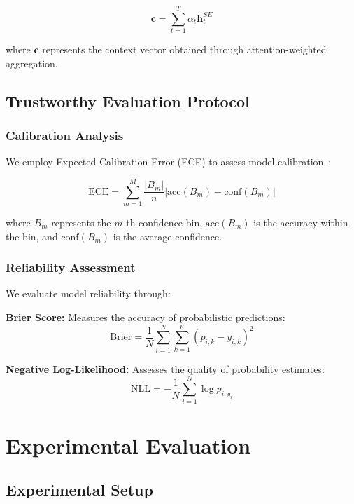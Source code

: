 \documentclass[journal]{IEEEtran}
\begin{document}
\begin{equation}
\mathbf{c} = \sum_{t=1}^{T} \alpha_t \mathbf{h}_t^{SE}
\end{equation}

where $\mathbf{c}$ represents the context vector obtained through attention-weighted aggregation.

\subsection{Trustworthy Evaluation Protocol}

\subsubsection{Calibration Analysis}

We employ Expected Calibration Error (ECE) to assess model calibration~\cite{calibration_guo2017}:

\begin{equation}
\text{ECE} = \sum_{m=1}^{M} \frac{|B_m|}{n} |\text{acc}(B_m) - \text{conf}(B_m)|
\end{equation}

where $B_m$ represents the $m$-th confidence bin, $\text{acc}(B_m)$ is the accuracy within the bin, and $\text{conf}(B_m)$ is the average confidence.

\subsubsection{Reliability Assessment}

We evaluate model reliability through:

\textbf{Brier Score:} Measures the accuracy of probabilistic predictions:
\begin{equation}
\text{Brier} = \frac{1}{N} \sum_{i=1}^{N} \sum_{k=1}^{K} (p_{i,k} - y_{i,k})^2
\end{equation}

\textbf{Negative Log-Likelihood:} Assesses the quality of probability estimates:
\begin{equation}
\text{NLL} = -\frac{1}{N} \sum_{i=1}^{N} \log p_{i,y_i}
\end{equation}

\section{Experimental Evaluation}

\subsection{Experimental Setup}
\end{document}
